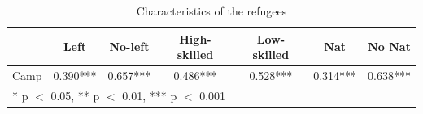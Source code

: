 \begin{table}
\centering
\caption{Characteristics of the refugees}
\centering
\begin{tabular}[t]{lcccccc}
\toprule
  & Left & No-left & High-skilled & Low-skilled & Nat & No Nat\\
\midrule
Camp & 0.390*** & 0.657*** & 0.486*** & 0.528*** & 0.314*** & 0.638***\\
\bottomrule
\multicolumn{7}{l}{\rule{0pt}{1em}* p $<$ 0.05, ** p $<$ 0.01, *** p $<$ 0.001}\\
\end{tabular}
\end{table}
